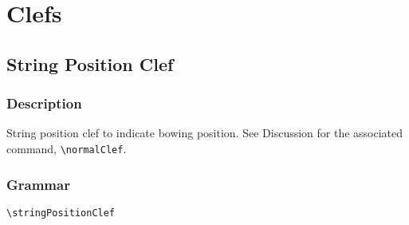 

\chapter {Clefs}


\section {String Position Clef}
\hfill
{}
\hfill

\subsection{Description}
String position clef to indicate bowing position. See Discussion for the associated command, \verb|\normalClef|.

\subsection{Grammar}
\begin{verbatim}
\stringPositionClef 
\end{verbatim}
